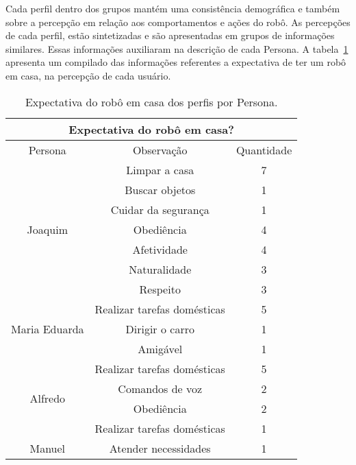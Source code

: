 Cada perfil dentro dos grupos mantém uma consistência demográfica e também sobre a percepção em relação aos comportamentos e ações do robô. As percepções de cada perfil, estão sintetizadas e são apresentadas em grupos de informações similares. Essas informações auxiliaram na descrição de cada Persona. A tabela~\ref{tab:expectativacasa} apresenta um compilado das informações referentes a expectativa de ter um robô em casa, na percepção de cada usuário.

\begin{table}[!ht]
	\caption{Expectativa do robô em casa dos perfis por Persona.}
	\label{tab:expectativacasa}
	\centering
	\begin{tabular}{c | c | c }
        \hline
        \multicolumn{3}{c}{Expectativa do robô em casa?} \\ \hline
        Persona & Observação & Quantidade \\ \hline
        \multirow{7}{*}{Joaquim} & Limpar a casa & 7 \\
        \hhline{~--}
        & Buscar objetos & 1 \\
        \hhline{~--}
        & Cuidar da segurança & 1 \\
        \hhline{~--}
        & Obediência & 4 \\
        \hhline{~--}
        & Afetividade & 4 \\
        \hhline{~--}
        & Naturalidade & 3 \\
        \hhline{~--}
        & Respeito & 3 \\
        \hline
        \multirow{3}{*}{Maria Eduarda} & Realizar tarefas domésticas & 5 \\
        \hhline{~--}
        & Dirigir o carro & 1 \\
        \hhline{~--}
        & Amigável & 1 \\
        \hline
        \multirow{4}{*}{Alfredo} & Realizar tarefas domésticas & 5 \\
        \hhline{~--}
        & Comandos de voz & 2 \\
        \hhline{~--}
        & Obediência & 2 \\
        \hline
        Danielo & Realizar tarefas domésticas & 1 \\
        \hline
        Manuel & Atender necessidades & 1 \\
        \hline
    \end{tabular}
\end{table}

